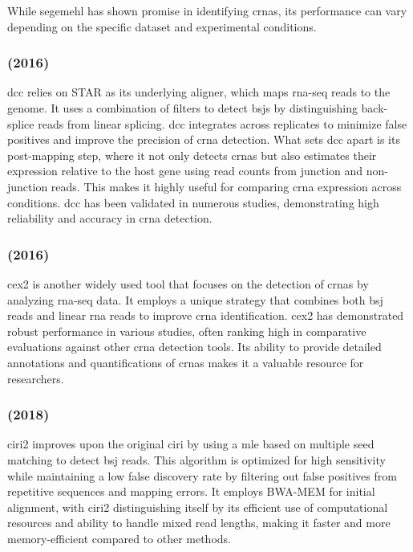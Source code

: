 While \gls{segemehl} has shown promise in identifying \glspl{crna}, its
performance can vary depending on the specific dataset and experimental
conditions\supercite{gao_ciri_2015,zeng_comprehensive_2017}.

\subsubsection{ (2016)}
\Gls{dcc} relies on STAR as its underlying aligner, which maps \gls{rna-seq}
reads to
the
genome.
It uses a combination of filters to detect \glspl{bsj} by distinguishing
back-splice reads from linear splicing.
\Gls{dcc} integrates across replicates to minimize false positives and improve
the
precision of \gls{crna} detection.
What sets \gls{dcc} apart is its post-mapping step, where it not only detects
\glspl{crna} but also estimates their expression relative to the host gene
using read counts from junction and non-junction reads.
This makes it highly useful for comparing \gls{crna} expression across
conditions\supercite{cheng_specific_2016}.
\Gls{dcc} has been validated in numerous studies, demonstrating high
reliability and
accuracy in \gls{crna} detection\supercite{paraboschi_interpreting_2018}.

\subsubsection{ (2016)}
\Gls{cex2} is another widely used tool that focuses on the detection of
\glspl{crna} by analyzing \gls{rna-seq} data.
It employs a unique strategy that combines both \gls{bsj} reads and linear
\gls{rna} reads to improve \gls{crna} identification.
\Gls{cex2} has demonstrated robust performance in various studies, often
ranking high in comparative evaluations against other \gls{crna} detection
tools\supercite{zeng_comprehensive_2017,nicolet_circular_2018}.
Its ability to provide detailed annotations and quantifications of \glspl{crna}
makes it a valuable resource for researchers\supercite{hansen_comparison_2016}.

\subsubsection{ (2018)}
\Gls{ciri2} improves upon the original \gls{ciri}\supercite{gao_ciri_2015} by
using a \gls{mle} based on multiple seed matching to detect \gls{bsj} reads.
This algorithm is optimized for high sensitivity while maintaining a low false
discovery rate by filtering out false positives from repetitive sequences and
mapping errors.
It employs BWA-MEM\supercite{li_fast_2009} for initial alignment, with
\gls{ciri2} distinguishing itself by its efficient use of computational
resources and ability to handle mixed read lengths, making it faster and more
memory-efficient compared to other methods\supercite{gao_circular_2018}.
